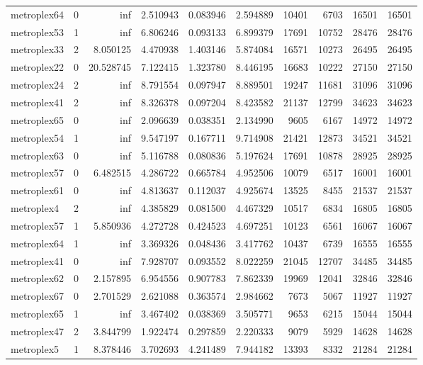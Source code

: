 \begin{longtable}{|l|r|r|r|r|r|r|r|r|r|}
metroplex64 & 0 & inf & 2.510943 & 0.083946 & 2.594889 & 10401 & 6703 & 16501 & 16501 \\
metroplex53 & 1 & inf & 6.806246 & 0.093133 & 6.899379 & 17691 & 10752 & 28476 & 28476 \\
metroplex33 & 2 & 8.050125 & 4.470938 & 1.403146 & 5.874084 & 16571 & 10273 & 26495 & 26495 \\
metroplex22 & 0 & 20.528745 & 7.122415 & 1.323780 & 8.446195 & 16683 & 10222 & 27150 & 27150 \\
metroplex24 & 2 & inf & 8.791554 & 0.097947 & 8.889501 & 19247 & 11681 & 31096 & 31096 \\
metroplex41 & 2 & inf & 8.326378 & 0.097204 & 8.423582 & 21137 & 12799 & 34623 & 34623 \\
metroplex65 & 0 & inf & 2.096639 & 0.038351 & 2.134990 & 9605 & 6167 & 14972 & 14972 \\
metroplex54 & 1 & inf & 9.547197 & 0.167711 & 9.714908 & 21421 & 12873 & 34521 & 34521 \\
metroplex63 & 0 & inf & 5.116788 & 0.080836 & 5.197624 & 17691 & 10878 & 28925 & 28925 \\
metroplex57 & 0 & 6.482515 & 4.286722 & 0.665784 & 4.952506 & 10079 & 6517 & 16001 & 16001 \\
metroplex61 & 0 & inf & 4.813637 & 0.112037 & 4.925674 & 13525 & 8455 & 21537 & 21537 \\
metroplex4 & 2 & inf & 4.385829 & 0.081500 & 4.467329 & 10517 & 6834 & 16805 & 16805 \\
metroplex57 & 1 & 5.850936 & 4.272728 & 0.424523 & 4.697251 & 10123 & 6561 & 16067 & 16067 \\
metroplex64 & 1 & inf & 3.369326 & 0.048436 & 3.417762 & 10437 & 6739 & 16555 & 16555 \\
metroplex41 & 0 & inf & 7.928707 & 0.093552 & 8.022259 & 21045 & 12707 & 34485 & 34485 \\
metroplex62 & 0 & 2.157895 & 6.954556 & 0.907783 & 7.862339 & 19969 & 12041 & 32846 & 32846 \\
metroplex67 & 0 & 2.701529 & 2.621088 & 0.363574 & 2.984662 & 7673 & 5067 & 11927 & 11927 \\
metroplex65 & 1 & inf & 3.467402 & 0.038369 & 3.505771 & 9653 & 6215 & 15044 & 15044 \\
metroplex47 & 2 & 3.844799 & 1.922474 & 0.297859 & 2.220333 & 9079 & 5929 & 14628 & 14628 \\
metroplex5 & 1 & 8.378446 & 3.702693 & 4.241489 & 7.944182 & 13393 & 8332 & 21284 & 21284 \\

\end{longtable}
